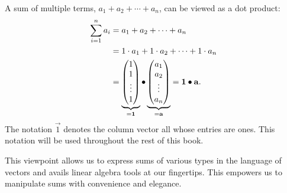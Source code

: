\documentclass{ximera}
\begin{document}
\begin{concept}
  A sum of multiple terms, $a_1 + a_2 + \cdots + a_n$, can be viewed as a
  dot product:
  \begin{align*}
    \sum_{i=1}^n a_i
    & = a_1 + a_2 + \cdots + a_n \\
    & = 1 \cdot a_1 + 1 \cdot a_2 + \cdots + 1 \cdot a_n \\
    & =
      \underbrace{
      \begin{pmatrix}
        1 \\ 1 \\ \vdots \\ 1
      \end{pmatrix}}_{=\mathbf{1}}
      \bullet
      \underbrace{
      \begin{pmatrix}
        a_1 \\ a_2 \\ \vdots \\ a_n
      \end{pmatrix}}_{=\mathbf{a}} = \mathbf{1} \bullet \mathbf{a}.
  \end{align*}
  The notation $\vec{1}$ denotes the column vector all whose entries
  are ones. This notation will be used throughout the rest of this
  book.

  This viewpoint allows us to express sums of various types in the
  language of vectors and avails linear algebra tools at our
  fingertips. This empowers us to manipulate sums with convenience and
  elegance.
\end{concept}
\end{document}

